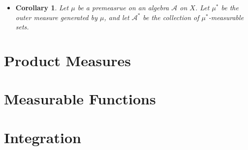 \documentclass[10pt]{article}
\newtheorem{corollary}[lemma]{Corollary}
\newcommand{\mcal}[1]{\mathcal{#1}}
\begin{document}
\begin{itemize}
\begin{proof}
    {\bf (Countable additivity)} In the proof of closure under countable union, we established that
    \begin{align*}
      \mu^*(A) 
      &\geq \sum_{i=1}^\infty \mu^*( A \cap E_i) + \mu^*(A \cap F^c) \\
      &\geq \mu^*\bigg( \bigcup_{i=1}^\infty (A \cap E_i) \bigg) + \mu^*(A \cap F^c) \\
      &= \mu^*( A \cap F) + \mu^*(A \cap F^c) \\
      &\geq \mu^*(A).
    \end{align*}
    Therefore, it must be the case that
    \begin{align*}
      \sum_{i=1}^\infty \mu^*( A \cap E_i) + \mu^*(A \cap F^c) 
      &= \mu^*\bigg( \bigcup_{i=1}^\infty (A \cap E_i) \bigg) + \mu^*(A \cap F^c),
    \end{align*}
    and this is true for any set $A \subseteq X$. Taking $A = F$, we have that
    \begin{align*}
      \sum_{i=1}^\infty \mu^*( F \cap E_i) + \mu^*(F \cap F^c) 
      &= \mu^*\bigg( \bigcup_{i=1}^\infty (F \cap E_i) \bigg) + \mu^*(F \cap F^c) \\
      \sum_{i=1}^\infty \mu^*( E_i ) + \mu^*(\emptyset) 
      &= \mu^*\bigg( \bigcup_{i=1}^\infty E_i \bigg) + \mu^*(\emptyset) \\
      \sum_{i=1}^\infty \mu^*( E_i )
      &= \mu^*\bigg( \bigcup_{i=1}^\infty E_i \bigg),
    \end{align*}
    which shows that $\mu^*$ is countably additive.
  \end{proof}

  \item \begin{corollary}
  Let $\mu$ be a premeasrue on an algebra $\mcal{A}$ on $X$. Let $\mu^*$ be the outer measure generated by $\mu$, and let $\mcal{A}^*$ be the collection of $\mu^*$-measurable sets. 
  \end{corollary}
\end{itemize}

\section{Product Measures}

\section{Measurable Functions}

\section{Integration}
\end{document}
